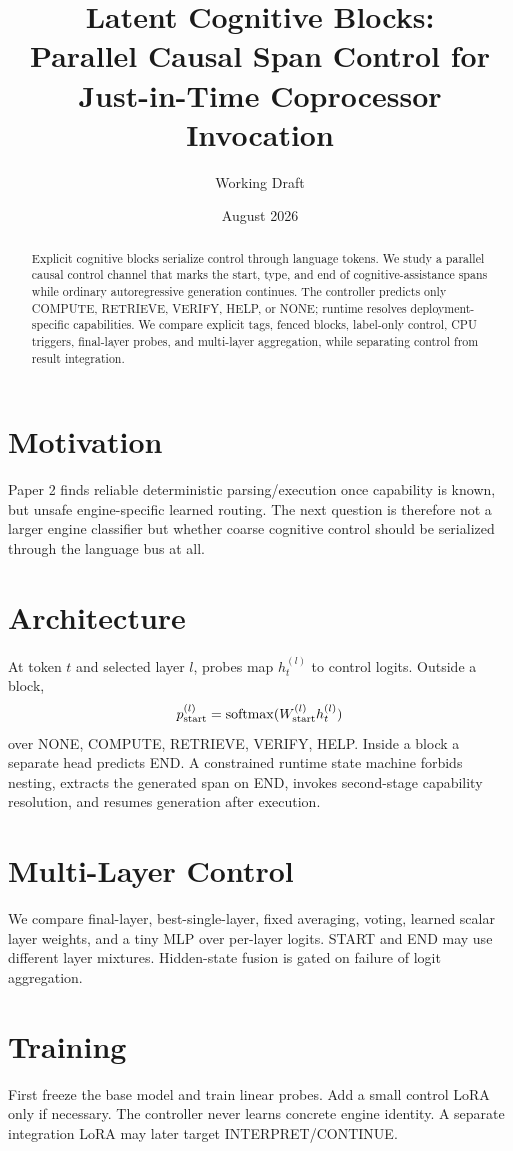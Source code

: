 \documentclass[10pt]{article}
\title{Latent Cognitive Blocks:\\Parallel Causal Span Control for Just-in-Time Coprocessor Invocation}
\author{Working Draft}\date{August 2026}
\begin{document}
\maketitle
\begin{abstract}
Explicit cognitive blocks serialize control through language tokens. We study a parallel causal control channel that marks the start, type, and end of cognitive-assistance spans while ordinary autoregressive generation continues. The controller predicts only COMPUTE, RETRIEVE, VERIFY, HELP, or NONE; runtime resolves deployment-specific capabilities. We compare explicit tags, fenced blocks, label-only control, CPU triggers, final-layer probes, and multi-layer aggregation, while separating control from result integration.
\end{abstract}
\section{Motivation}
Paper 2 finds reliable deterministic parsing/execution once capability is known, but unsafe engine-specific learned routing. The next question is therefore not a larger engine classifier but whether coarse cognitive control should be serialized through the language bus at all.
\section{Architecture}
At token $t$ and selected layer $l$, probes map $h_t^{(l)}$ to control logits. Outside a block,
\[
p_{\rm start}^{(l)}=\mathrm{softmax}(W_{\rm start}^{(l)}h_t^{(l)})
\]
over NONE, COMPUTE, RETRIEVE, VERIFY, HELP. Inside a block a separate head predicts END. A constrained runtime state machine forbids nesting, extracts the generated span on END, invokes second-stage capability resolution, and resumes generation after execution.
\section{Multi-Layer Control}
We compare final-layer, best-single-layer, fixed averaging, voting, learned scalar layer weights, and a tiny MLP over per-layer logits. START and END may use different layer mixtures. Hidden-state fusion is gated on failure of logit aggregation.
\section{Training}
First freeze the base model and train linear probes. Add a small control LoRA only if necessary. The controller never learns concrete engine identity. A separate integration LoRA may later target INTERPRET/CONTINUE.
\end{document}
